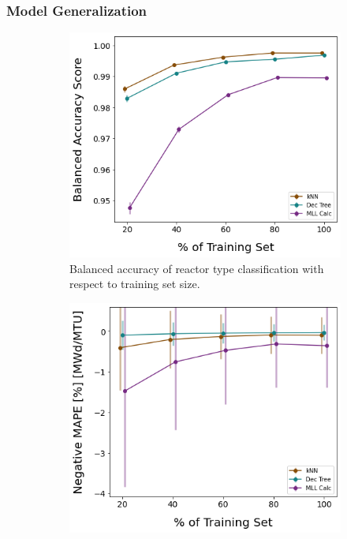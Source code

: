 
\subsubsection{Model Generalization}

\begin{figure}[!htb]
    \centering
    \begin{subfigure}[b]{0.49\textwidth}
        \centering
        \includegraphics[width=\textwidth]{./chapters/exp1/learncurve_nuc29_BalAcc_rxtr.png}
        \caption{Balanced accuracy of reactor type classification with respect 
                 to training set size.}
        \label{fig:learnsA}
    \end{subfigure}
    \hfill
    \begin{subfigure}[b]{0.49\textwidth}
        \centering
        \includegraphics[width=\textwidth]{./chapters/exp1/learncurve_nuc29_MAPE_burn.png}

\end{subfigure}
\end{figure}
